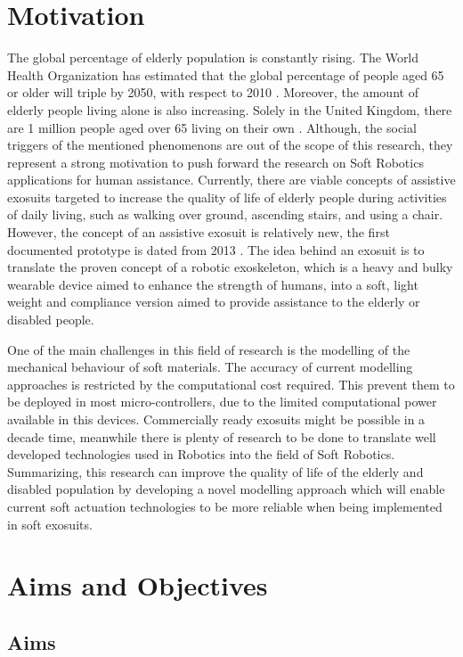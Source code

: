 \section{Motivation}

The global percentage of elderly population is constantly rising. The World Health Organization has estimated that the global percentage of people aged 65 or older will triple by 2050, with respect to 2010 \cite{Colombo2012}. Moreover, the amount of elderly people living alone is also increasing. Solely in the United Kingdom, there are 1 million people aged over 65 living on their own \cite{Hill2019}. Although, the social triggers of the mentioned phenomenons are out of the scope of this research, they represent a strong motivation to push forward the research on Soft Robotics applications for human assistance. Currently, there are viable concepts of assistive exosuits targeted to increase the quality of life of elderly people during activities of daily living, such as walking over ground, ascending stairs, and using a chair. However, the concept of an assistive exosuit is relatively new, the first documented prototype is dated from 2013 \cite{wehner2013lightweight}. The idea behind an exosuit is to translate the proven concept of a robotic exoskeleton, which is a heavy and bulky wearable device aimed to enhance the strength of humans, into a soft, light weight and compliance version aimed to provide assistance to the elderly or disabled people. 

One of the main challenges in this field of research is the modelling of the mechanical behaviour of soft materials. The accuracy of current modelling approaches is restricted by the computational cost required. This prevent them to be deployed in most micro-controllers, due to the limited computational power available in this devices. Commercially ready exosuits might be possible in a decade time, meanwhile there is plenty of research to be done to translate well developed technologies used in Robotics into the field of Soft Robotics. Summarizing, this research can improve the quality of life of the elderly and disabled population by developing a novel modelling approach which will enable current soft actuation technologies to be more reliable when being implemented in soft exosuits.

\section{Aims and Objectives}

\subsection{Aims}

